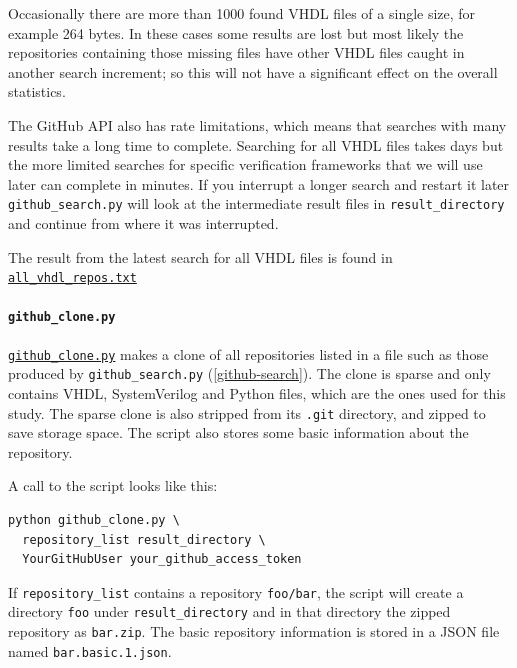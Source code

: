 \documentclass[]{article}
\let\oldparagraph\paragraph
\renewcommand{\paragraph}[1]{\oldparagraph{#1}\mbox{}}
\begin{document}
Occasionally there are more than 1000 found VHDL files of a single size, for example 264 bytes. In these cases some results are lost but most likely the repositories containing those missing files have other VHDL files caught in another search increment; so this will not have a significant effect on the overall statistics.

The GitHub API also has rate limitations, which means that searches with many results take a long time to complete. Searching for all VHDL files takes days but the more limited searches for specific verification frameworks that we will use later can complete in minutes. If you interrupt a longer search and restart it later \texttt{github\_search.py} will look at the intermediate result files in \texttt{result\_directory} and continue from where it was interrupted.

The result from the latest search for all VHDL files is found in \href{https://github.com/LarsAsplund/github-facts/tree/main/all_vhdl_repos.txt}{\texttt{all\_vhdl\_repos.txt}}

\hypertarget{github-clone}{%
\paragraph{\texorpdfstring{\texttt{github\_clone.py}}{github\_clone.py}}\label{github-clone}}

\href{https://github.com/LarsAsplund/github-facts/tree/main/py/github_clone.py}{\texttt{github\_clone.py}} makes a clone of all repositories listed in a file such as those produced by \texttt{github\_search.py} (\ref{github-search}). The clone is sparse and only contains VHDL, SystemVerilog and Python files, which are the ones used for this study. The sparse clone is also stripped from its \texttt{.git} directory, and zipped to save storage space. The script also stores some basic information about the repository.

A call to the script looks like this:

\begin{verbatim}
python github_clone.py \
  repository_list result_directory \
  YourGitHubUser your_github_access_token
\end{verbatim}

If \texttt{repository\_list} contains a repository \texttt{foo/bar}, the script will create a directory \texttt{foo} under \texttt{result\_directory} and in that directory the zipped repository as \texttt{bar.zip}. The basic repository information is stored in a JSON file named \texttt{bar.basic.1.json}.
\end{document}
